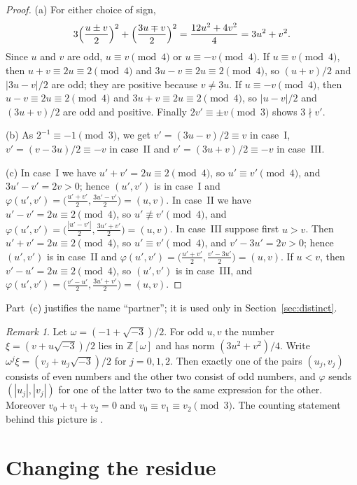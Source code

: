 \documentclass[11pt]{amsart}
\theoremstyle{definition}
\theoremstyle{remark}
\newtheorem{remark}[theorem]{Remark}
\newcommand{\Z}{\mathbb{Z}}
\begin{document}
\begin{proof}
(a) For either choice of sign,
\[
3\Bigl(\frac{u\pm v}{2}\Bigr)^2+\Bigl(\frac{3u\mp v}{2}\Bigr)^2=\frac{12u^2+4v^2}{4}=3u^2+v^2 .
\]
Since $u$ and $v$ are odd, $u\equiv v\pmod 4$ or $u\equiv -v\pmod 4$.
If $u\equiv v\pmod 4$, then $u+v\equiv 2u\equiv 2\pmod 4$ and $3u-v\equiv 2u\equiv 2\pmod 4$,
so $(u+v)/2$ and $|3u-v|/2$ are odd; they are positive because $v\ne 3u$.
If $u\equiv -v\pmod 4$, then $u-v\equiv 2u\equiv 2\pmod 4$ and $3u+v\equiv 2u\equiv 2\pmod 4$,
so $|u-v|/2$ and $(3u+v)/2$ are odd and positive.
Finally $2v'\equiv \pm v\pmod 3$ shows $3\nmid v'$.

(b) As $2^{-1}\equiv -1\pmod 3$, we get $v'=(3u-v)/2\equiv v$ in case~I,
$v'=(v-3u)/2\equiv -v$ in case~II and $v'=(3u+v)/2\equiv -v$ in case~III.

(c) In case~I we have $u'+v'=2u\equiv 2\pmod 4$, so $u'\equiv v'\pmod 4$, and
$3u'-v'=2v>0$; hence $(u',v')$ is in case~I and $\varphi(u',v')=\bigl(\tfrac{u'+v'}{2},\tfrac{3u'-v'}{2}\bigr)=(u,v)$.
In case~II we have $u'-v'=2u\equiv 2\pmod 4$, so $u'\not\equiv v'\pmod 4$, and
$\varphi(u',v')=\bigl(\tfrac{|u'-v'|}{2},\tfrac{3u'+v'}{2}\bigr)=(u,v)$.
In case~III suppose first $u>v$. Then $u'+v'=2u\equiv 2\pmod 4$, so $u'\equiv v'\pmod 4$, and
$v'-3u'=2v>0$; hence $(u',v')$ is in case~II and
$\varphi(u',v')=\bigl(\tfrac{u'+v'}{2},\tfrac{v'-3u'}{2}\bigr)=(u,v)$.
If $u<v$, then $v'-u'=2u\equiv 2\pmod 4$, so $(u',v')$ is in case~III, and
$\varphi(u',v')=\bigl(\tfrac{v'-u'}{2},\tfrac{3u'+v'}{2}\bigr)=(u,v)$.
\end{proof}

Part~(c) justifies the name ``partner''; it is used only in Section~\ref{sec:distinct}.

\begin{remark}\label{rem:eisenstein}
Let $\omega=(-1+\sqrt{-3})/2$. For odd $u,v$ the number $\xi=(v+u\sqrt{-3})/2$ lies in $\Z[\omega]$ and has norm $(3u^2+v^2)/4$.
Write $\omega^j\xi=(v_j+u_j\sqrt{-3})/2$ for $j=0,1,2$. Then exactly one of the pairs $(u_j,v_j)$ consists of even numbers and
the other two consist of odd numbers, and $\varphi$ sends $(|u_j|,|v_j|)$ for one of the latter two to the same expression for the other.
Moreover $v_0+v_1+v_2=0$ and $v_0\equiv v_1\equiv v_2\pmod 3$.
The counting statement behind this picture is \cite[Lemma~3.2]{S15}.
\end{remark}

\section{Changing the residue}\label{sec:descent}
\end{document}
